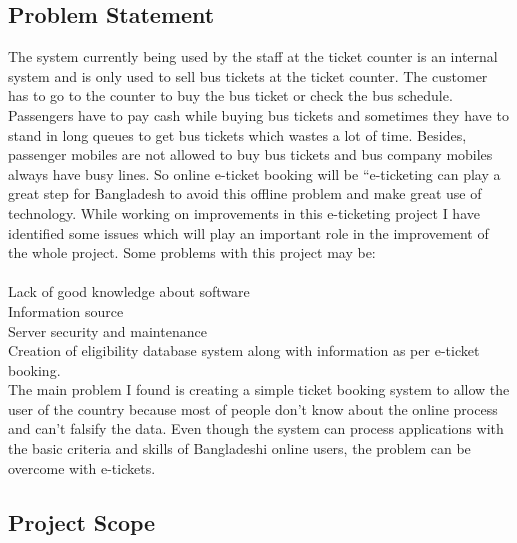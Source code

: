 \documentclass{article}
\begin{document}
\subsection{Problem Statement}
The system currently being used by the staff at the ticket counter is an internal system and is only used to sell bus tickets at the ticket counter. The customer has to go to the counter to buy the bus ticket or check the bus schedule. Passengers have to pay cash while buying bus tickets and sometimes they have to stand in long queues to get bus tickets which wastes a lot of time. Besides, passenger mobiles are not allowed to buy bus tickets and bus company mobiles always have busy lines.
  So online e-ticket booking will be “e-ticketing can play a great step for Bangladesh to avoid this offline problem and make great use of technology.
While working on improvements in this e-ticketing project I have identified some issues which will play an important role in the improvement of the whole project. Some problems with this project may be:\\\\
\textbullet Lack of good knowledge about software\\
\textbullet Information source\\
\textbullet Server security and maintenance\\
\textbullet Creation of eligibility database system along with information as per e-ticket booking.\\
The main problem I found is creating a simple ticket booking system to allow the user of the country because most of people don't know about the online process and can't falsify the data. Even though the system can process applications with the basic criteria and skills of Bangladeshi online users, the problem can be overcome with e-tickets.

\newpage

\subsection{Project Scope}
\end{document}
